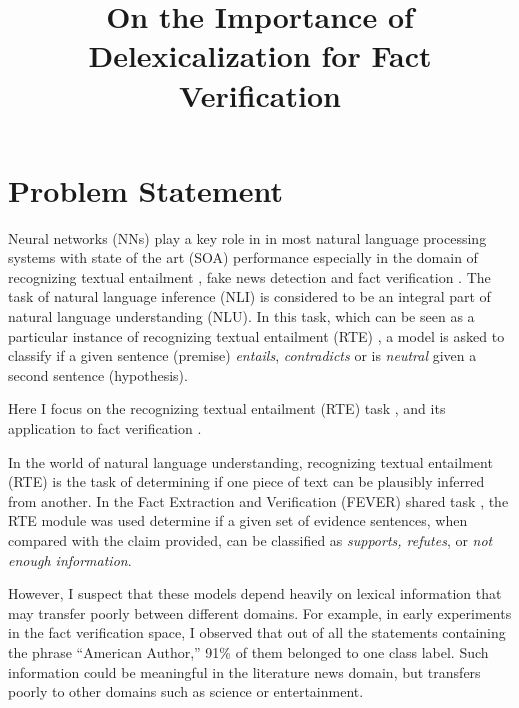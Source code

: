 \documentclass[compsoc,onecolumn]{IEEEtran}
\begin{document}
\title{On the Importance of Delexicalization for Fact Verification}


\author{\IEEEauthorblockN{}
}



\maketitle



\section{Problem Statement}
Neural networks (NNs)  play a key role in in most natural language processing systems with state of the art (SOA) performance \citep*{devlin2018bert, sun2018improving,bohnet2018morphosyntactic} especially in the domain of recognizing textual entailment \citep*{kim2018semantic}, fake news detection \citep*{baird2017talos} and fact verification \citep*{nie2018combining}.
The task of natural language inference (NLI) is considered to be an integral part of natural language understanding (NLU). In this task, which can be seen as a particular instance of recognizing textual entailment (RTE) \citep*{fyodorov2000natural,condoravdi2003entailment,bos2005recognising,maccartney2009extended}, a model is asked to classify if a given sentence (premise) \textit{entails}, \textit{contradicts} or is \textit{neutral} given a second sentence (hypothesis).

Here I focus on the recognizing textual entailment (RTE) task \citep*{dagan2013recognizing}, and its application to fact verification \citep*{thorne2018fever}.

In the world of natural language understanding, recognizing textual entailment (RTE) is the task of determining if one piece of text can be plausibly inferred from another. In the Fact Extraction and Verification (FEVER) shared task \citep*{thorne2018fever}, the RTE module was used determine if a given set of evidence sentences, when compared with the claim provided, can be classified as \textit{supports, refutes}, or \textit{not enough information}.


However, I suspect that these models depend heavily on lexical information that may transfer poorly between different domains. For example, in early experiments in the fact verification space, I observed that out of all the statements containing the phrase ``American Author,'' 91\% of them belonged to one class label. Such information could be meaningful in the literature news domain, but transfers poorly to other domains such as science or entertainment. 
\end{document}
